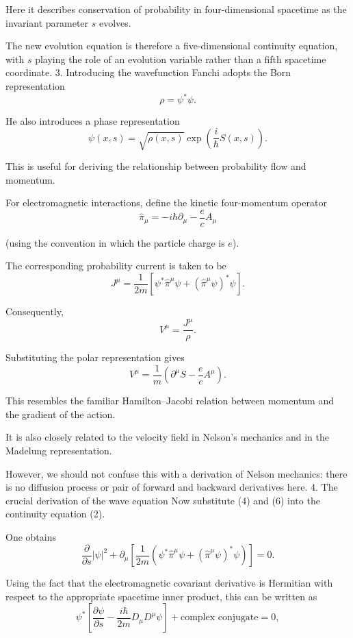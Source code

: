 Here it describes conservation of probability in four-dimensional spacetime as the invariant parameter \(s\) evolves.

The new evolution equation is therefore a five-dimensional continuity equation, with \(s\) playing the role of an evolution variable rather than a fifth spacetime coordinate.
3. Introducing the wavefunction
Fanchi adopts the Born representation
\[
\rho=\psi^*\psi.
\tag{4}
\]

He also introduces a phase representation
\[
\psi(x,s)=\sqrt{\rho(x,s)}
\exp\left(\frac{i}{\hbar}S(x,s)\right).
\tag{5}
\]

This is useful for deriving the relationship between probability flow and momentum.

For electromagnetic interactions, define the kinetic four-momentum operator
\[
\hat\pi_\mu=
-i\hbar\partial_\mu-\frac ec A_\mu
\]

(using the convention in which the particle charge is \(e\)).

The corresponding probability current is taken to be
\[
J^\mu=
\frac{1}{2m}
\left[
\psi^*\hat\pi^\mu\psi+
(\hat\pi^\mu\psi)^*\psi
\right].
\tag{6}
\]

Consequently,
\[
V^\mu=\frac{J^\mu}{\rho}.
\]

Substituting the polar representation gives
\[
\boxed{
V^\mu=
\frac{1}{m}
\left(
\partial^\mu S-\frac ec A^\mu
\right).
}
\tag{7}
\]

This resembles the familiar Hamilton–Jacobi relation between momentum and the gradient of the action.

It is also closely related to the velocity field in Nelson's mechanics and in the Madelung representation.

However, we should not confuse this with a derivation of Nelson mechanics: there is no diffusion process or pair of forward and backward derivatives here.
4. The crucial derivation of the wave equation
Now substitute (4) and (6) into the continuity equation (2).

One obtains
\[
\frac{\partial}{\partial s}|\psi|^2
+
\partial_\mu
\left[
\frac{1}{2m}
\left(
\psi^*\hat\pi^\mu\psi+
(\hat\pi^\mu\psi)^*\psi
\right)
\right]=0.
\tag{8}
\]

Using the fact that the electromagnetic covariant derivative is Hermitian with respect to the appropriate spacetime inner product, this can be written as
\[
\psi^*
\left[
\frac{\partial\psi}{\partial s}
-\frac{i\hbar}{2m}
D_\mu D^\mu\psi
\right]
+
\text{complex conjugate}=0,
\]

